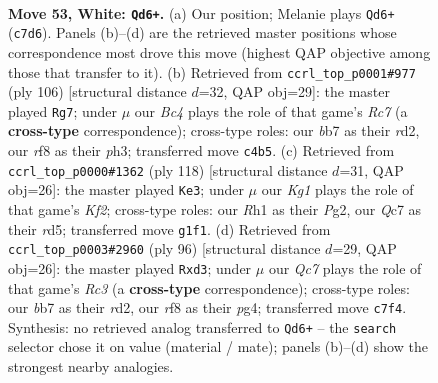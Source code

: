 \documentclass[11pt]{article}
\begin{document}
\clearpage

\begin{figure}[p]\centering
\begin{subfigure}{0.46\textwidth}\centering
\resizebox{\linewidth}{!}{%
\newchessgame
\chessboard[
  setfen={5r2/1bQ5/5k2/8/2B5/7P/1p4P1/6KR w - - 15 53},
  showmover=false,
  pgfstyle=straightmove, color=movearrow, markmove={c7-d6}
]}
\caption{}
\end{subfigure}\hfill
\begin{subfigure}{0.46\textwidth}\centering
\resizebox{\linewidth}{!}{%
\newchessgame
\chessboard[
  setfen={4k1b1/2R5/8/p1P2P2/4KB2/7p/2Pr4/8 w - - 2 54},
  showmover=false,
  pgfstyle=straightmove, color=movearrow, markmove={c7-g7}
]}
\caption{}
\end{subfigure}
\\[4pt]
\begin{subfigure}{0.46\textwidth}\centering
\resizebox{\linewidth}{!}{%
\newchessgame
\chessboard[
  setfen={2b5/5k2/5p2/3r4/1R1B4/5P2/5KP1/8 w - - 33 60},
  showmover=false,
  pgfstyle=straightmove, color=movearrow, markmove={f2-e3}
]}
\caption{}
\end{subfigure}\hfill
\begin{subfigure}{0.46\textwidth}\centering
\resizebox{\linewidth}{!}{%
\newchessgame
\chessboard[
  setfen={8/8/2B2k2/8/6p1/2Rb2P1/3r1PK1/8 w - - 2 49},
  showmover=false,
  pgfstyle=straightmove, color=movearrow, markmove={c3-d3}
]}
\caption{}
\end{subfigure}
\caption{\textbf{Move 53, White: \texttt{Qd6+}.} (a) Our position; Melanie plays \texttt{Qd6+} (\texttt{c7d6}). Panels (b)--(d) are the retrieved master positions whose correspondence most drove this move (highest QAP objective among those that transfer to it). (b) Retrieved from \texttt{ccrl\_top\_p0001\#977} (ply 106) [structural distance $d$=32, QAP obj=29]: the master played \texttt{Rg7}; under $\mu$ our \emph{Bc4} plays the role of that game's \emph{Rc7} (a \textbf{cross-type} correspondence); cross-type roles: our \emph{b}b7 as their \emph{r}d2, our \emph{r}f8 as their \emph{p}h3; transferred move \texttt{c4b5}. (c) Retrieved from \texttt{ccrl\_top\_p0000\#1362} (ply 118) [structural distance $d$=31, QAP obj=26]: the master played \texttt{Ke3}; under $\mu$ our \emph{Kg1} plays the role of that game's \emph{Kf2}; cross-type roles: our \emph{R}h1 as their \emph{P}g2, our \emph{Q}c7 as their \emph{r}d5; transferred move \texttt{g1f1}. (d) Retrieved from \texttt{ccrl\_top\_p0003\#2960} (ply 96) [structural distance $d$=29, QAP obj=26]: the master played \texttt{Rxd3}; under $\mu$ our \emph{Qc7} plays the role of that game's \emph{Rc3} (a \textbf{cross-type} correspondence); cross-type roles: our \emph{b}b7 as their \emph{r}d2, our \emph{r}f8 as their \emph{p}g4; transferred move \texttt{c7f4}. Synthesis: no retrieved analog transferred to \texttt{Qd6+} -- the \texttt{search} selector chose it on value (material / mate); panels (b)--(d) show the strongest nearby analogies.}
\label{fig:thought-m104}
\end{figure}
\end{document}

